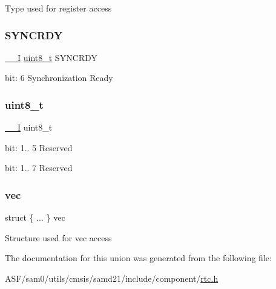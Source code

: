 Type used for register access \mbox{\label{union_r_t_c___m_o_d_e0___i_n_t_f_l_a_g___type_ae8a10cfa0bb63130ae1e8150943d680b}} 
\subsubsection{\texorpdfstring{SYNCRDY}{SYNCRDY}}
{\footnotesize\ttfamily \mbox{\hyperlink{core__cm0plus_8h_af63697ed9952cc71e1225efe205f6cd3}{\+\_\+\+\_\+I}} \mbox{\hyperlink{union_r_t_c___m_o_d_e0___i_n_t_f_l_a_g___type_a5b4208c6f4c4a4290c4f2804d1eb1d5b}{uint8\+\_\+t}} S\+Y\+N\+C\+R\+DY}

bit\+: 6 Synchronization Ready \mbox{\label{union_r_t_c___m_o_d_e0___i_n_t_f_l_a_g___type_a5b4208c6f4c4a4290c4f2804d1eb1d5b}} 
\subsubsection{\texorpdfstring{uint8\_t}{uint8\_t}}
{\footnotesize\ttfamily \mbox{\hyperlink{core__cm0plus_8h_af63697ed9952cc71e1225efe205f6cd3}{\+\_\+\+\_\+I}} uint8\+\_\+t}

bit\+: 1.. 5 Reserved

bit\+: 1.. 7 Reserved \mbox{\label{union_r_t_c___m_o_d_e0___i_n_t_f_l_a_g___type_a2cfa2c849eabd5cece0676294b22c407}} 
\subsubsection{\texorpdfstring{vec}{vec}}
{\footnotesize\ttfamily struct \{ ... \}   vec}

Structure used for vec access 

The documentation for this union was generated from the following file\+:\begin{DoxyCompactItemize}
\item 
A\+S\+F/sam0/utils/cmsis/samd21/include/component/\mbox{\hyperlink{component_2rtc_8h}{rtc.\+h}}\end{DoxyCompactItemize}

